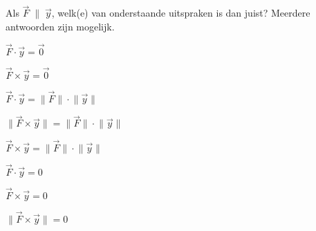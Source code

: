 \documentclass{ximera}
\begin{document}
\begin{exercise}
	
Als \(\vec{F} \; \| \; \vec{y}\), welk(e) van onderstaande uitspraken is dan juist? 
Meerdere antwoorden zijn mogelijk. 

\begin{question}
\(\vec{F} \cdot \vec{y} = \vec{0}\)
\end{question}

\begin{question}
\(\vec{F} \times \vec{y} = \vec{0}\)
\end{question}

\begin{question}
\(\vec{F} \cdot \vec{y} = \lVert \vec{F} \rVert \cdot \lVert \vec{y} \rVert\)	
\end{question}

\begin{question}
\(\lVert \vec{F} \times \vec{y} \rVert = \lVert \vec{F} \rVert \cdot \lVert \vec{y} \rVert\)	
\end{question}

\begin{question}
\(\vec{F} \times \vec{y} = \lVert \vec{F} \rVert \cdot \lVert \vec{y} \rVert\)	
\end{question}

\begin{question}
\(\vec{F} \cdot \vec{y} = 0\)
\end{question}

\begin{question}
\(\vec{F} \times \vec{y} = 0\)
\end{question}

\begin{question}
\(\lVert \vec{F} \times \vec{y} \rVert = 0\)
\end{question}
	
\end{exercise}
	
\end{document}
